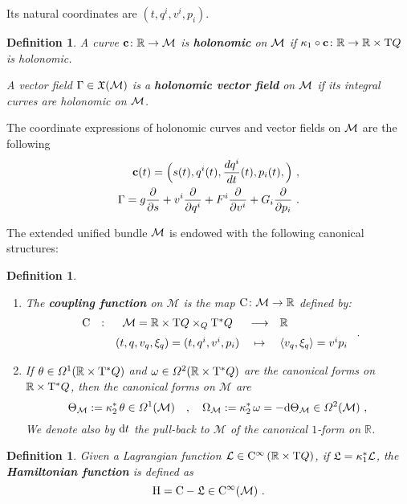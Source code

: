 \documentclass[12pt]{report}
\newtheorem{definition}[teor]{Definition}
\def\beann{\begin{eqnarray*}}
\def\eeann{\end{eqnarray*}}
\def\ben{\begin{enumerate}}
\def\een{\end{enumerate}}
\def\derpar#1#2{\frac{\partial{#1}}{\partial{#2}}}
\def\vf{\mathfrak X}
\def\df{{\mit\Omega}}
\def\Lag{{\cal L}}
\def\d{{\rm d}}
\def\Real{\mathbb{R}}
\def\Tan{{\rm T}}
\def\Cinfty{{\rm C}^\infty}
\begin{document}
Its natural coordinates are $(t,q^i,v^i,p_i)$. 

\begin{definition}
A curve ${\bf c}\colon\Real\rightarrow{\cal M}$
is \textbf{holonomic} on ${\cal M}$ if
$\kappa_1\circ{\bf c}\colon\Real\to\Real\times\Tan Q$ is holonomic.

A vector field $\Gamma \in\vf({\cal M})$  is a \textbf{holonomic vector field} on ${\cal M}$
if its integral curves  are holonomic on ${\cal M}$. 
\end{definition}

The coordinate expressions of holonomic curves and vector fields on  ${\cal M}$ are the following
\beann
{\bf c}(t)=\Big(s(t),q^i(t),\frac{dq^i}{d t}(t),p_i(t),\Big) \ , \\
\Gamma= g\derpar{}{s}+v^i\derpar{}{q^i}+F^i\derpar{}{v^i}+G_i\derpar{}{p_i}  \ .
\eeann

The extended unified bundle ${\cal M}$ is endowed with the following canonical structures:

\begin{definition}
\ben
\item
The \textbf{coupling function} on ${\mathcal M}$
is the map ${\rm C}\colon{\mathcal M}\to\Real$  defined by:
$$
\begin{array}{ccccl}
{\rm C} & : & {\mathcal M}=\Real
\times\Tan Q \times_Q\Tan^*Q& \longrightarrow & \Real \\
\noalign{\medskip} & & (t, q,v_q,\xi_q)=(t,q^i,v^i,p_i)
 & \mapsto &  \langle v_q,\xi_q\rangle=v^ip_i
\end{array} \ .
$$
\item
If $\theta\in\df^1(\Real\times\Tan^*Q)$ and $\omega\in\df^2(\Real\times\Tan^*Q)$
are the canonical forms on $\Real\times\Tan^*Q$,
then the canonical forms on ${\mathcal M}$ are
$$
\Theta_{\mathcal M}:=\kappa_2^*\,\theta\in\df^1({\mathcal M})
\quad , \quad
\Omega_{\mathcal M}:=\kappa_2^*\,\omega=-\d\Theta_{\mathcal M}\in\df^2({\mathcal M}) \ ,
$$
We denote also by $\d t$ the pull-back to ${\mathcal M}$ of the canonical $1$-form on $\Real$.
\een
\end{definition}

\begin{definition}
Given a Lagrangian function $\Lag\in\Cinfty \left(\Real \times \Tan Q \right)$,
if ${\mathfrak L}=\kappa_1^*\Lag$, the \textbf{Hamiltonian function} is defined as
$$
{\rm H}={\rm C}-{\mathfrak L}\in\Cinfty({\mathcal M}) \ .
$$
\end{definition}
\end{document}
